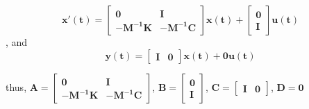 \documentclass[12pt,a4paper]{article}
\begin{document}
\[
    \mathbf{x'(t)} = \begin{bmatrix}
        \mathbf{0} & \mathbf{I}\\
        \mathbf{-\mathbf{M}^{-1}\mathbf{K}} & \mathbf{-\mathbf{M}^{-1}\mathbf{\mathbf{C}}}
    \end{bmatrix}
    \mathbf{x(t)}+ \begin{bmatrix}
        \mathbf{0}\\
        \mathbf{I}
    \end{bmatrix}\mathbf{u(t)}
\], and
\[
    \mathbf{y(t)} = \begin{bmatrix}
        \mathbf{I} & \mathbf{0}
    \end{bmatrix}
    \mathbf{x(t)} + 
        \mathbf{0}\mathbf{u(t)}
\]

thus, $\mathbf{A} = \begin{bmatrix}
    \mathbf{0} & \mathbf{I}\\
    \mathbf{-\mathbf{M}^{-1}\mathbf{K}} & \mathbf{-\mathbf{M}^{-1}\mathbf{\mathbf{C}}}
\end{bmatrix}$, $\mathbf{B} = \begin{bmatrix}
    \mathbf{0}\\
    \mathbf{I}
\end{bmatrix}$, $\mathbf{\mathbf{C}}=\begin{bmatrix}
    \mathbf{I} & \mathbf{0}
\end{bmatrix}$, $\mathbf{D}=\mathbf{0}$
\end{document}
